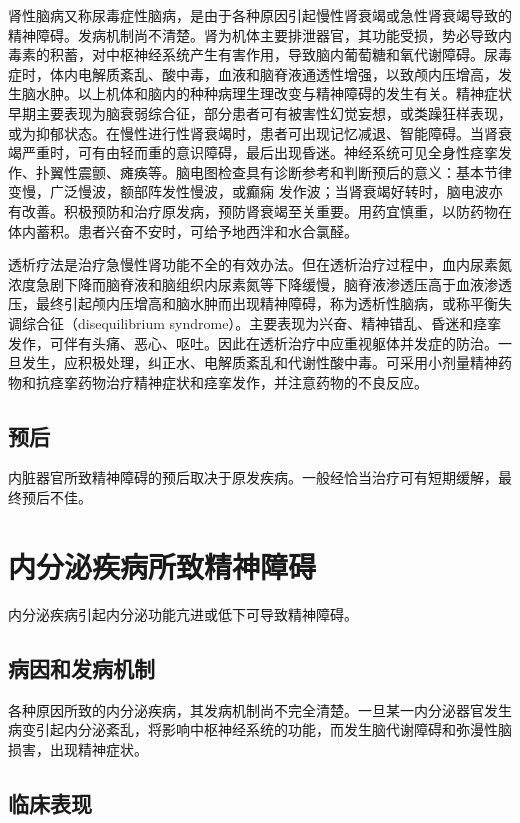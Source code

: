 肾性脑病又称尿毒症性脑病，是由于各种原因引起慢性肾衰竭或急性肾衰竭导致的精神障碍。发病机制尚不清楚。肾为机体主要排泄器官，其功能受损，势必导致内毒素的积蓄，对中枢神经系统产生有害作用，导致脑内葡萄糖和氧代谢障碍。尿毒症时，体内电解质紊乱、酸中毒，血液和脑脊液通透性增强，以致颅内压增高，发生脑水肿。以上机体和脑内的种种病理生理改变与精神障碍的发生有关。精神症状早期主要表现为脑衰弱综合征，部分患者可有被害性幻觉妄想，或类躁狂样表现，或为抑郁状态。在慢性进行性肾衰竭时，患者可出现记忆减退、智能障碍。当肾衰竭严重时，可有由轻而重的意识障碍，最后出现昏迷。神经系统可见全身性痉挛发作、扑翼性震颤、瘫痪等。脑电图检查具有诊断参考和判断预后的意义：基本节律变慢，广泛慢波，额部阵发性慢波，或癫痫
发作波；当肾衰竭好转时，脑电波亦有改善。积极预防和治疗原发病，预防肾衰竭至关重要。用药宜慎重，以防药物在体内蓄积。患者兴奋不安时，可给予地西泮和水合氯醛。

透析疗法是治疗急慢性肾功能不全的有效办法。但在透析治疗过程中，血内尿素氮浓度急剧下降而脑脊液和脑组织内尿素氮等下降缓慢，脑脊液渗透压高于血液渗透压，最终引起颅内压增高和脑水肿而出现精神障碍，称为透析性脑病，或称平衡失调综合征（disequilibrium
syndrome）。主要表现为兴奋、精神错乱、昏迷和痉挛发作，可伴有头痛、恶心、呕吐。因此在透析治疗中应重视躯体并发症的防治。一旦发生，应积极处理，纠正水、电解质紊乱和代谢性酸中毒。可采用小剂量精神药物和抗痉挛药物治疗精神症状和痉挛发作，并注意药物的不良反应。

\subsection{预后}

内脏器官所致精神障碍的预后取决于原发疾病。一般经恰当治疗可有短期缓解，最终预后不佳。

\section{内分泌疾病所致精神障碍}

内分泌疾病引起内分泌功能亢进或低下可导致精神障碍。

\subsection{病因和发病机制}

各种原因所致的内分泌疾病，其发病机制尚不完全清楚。一旦某一内分泌器官发生病变引起内分泌紊乱，将影响中枢神经系统的功能，而发生脑代谢障碍和弥漫性脑损害，出现精神症状。

\subsection{临床表现}

